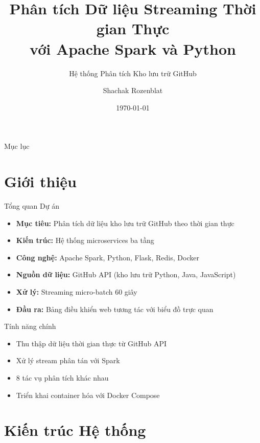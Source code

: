 \documentclass[aspectratio=169]{beamer}
\title[Phân tích Dữ liệu Streaming Thời gian Thực]{Phân tích Dữ liệu Streaming Thời gian Thực\\với Apache Spark và Python}
\subtitle{Hệ thống Phân tích Kho lưu trữ GitHub}
\author{Shachak Rozenblat}
\institute{Mã số sinh viên: 216141459}
\date{\today}
\begin{document}
\frame{\titlepage}

\begin{frame}{Mục lục}
    \tableofcontents
\end{frame}

\section{Giới thiệu}

\begin{frame}{Tổng quan Dự án}
    \begin{itemize}
        \item \textbf{Mục tiêu:} Phân tích dữ liệu kho lưu trữ GitHub theo thời gian thực
        \item \textbf{Kiến trúc:} Hệ thống microservices ba tầng
        \item \textbf{Công nghệ:} Apache Spark, Python, Flask, Redis, Docker
        \item \textbf{Nguồn dữ liệu:} GitHub API (kho lưu trữ Python, Java, JavaScript)
        \item \textbf{Xử lý:} Streaming micro-batch 60 giây
        \item \textbf{Đầu ra:} Bảng điều khiển web tương tác với biểu đồ trực quan
    \end{itemize}
    
    \vspace{0.5cm}
    \begin{block}{Tính năng chính}
        \begin{itemize}
            \item Thu thập dữ liệu thời gian thực từ GitHub API
            \item Xử lý stream phân tán với Spark
            \item 8 tác vụ phân tích khác nhau
            \item Triển khai container hóa với Docker Compose
        \end{itemize}
    \end{block}
\end{frame}

\section{Kiến trúc Hệ thống}
\end{document}
